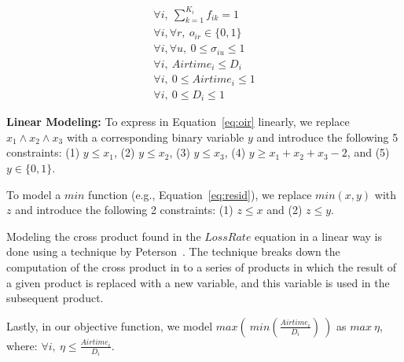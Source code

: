 \vspace{-0.1in}
\begin{eqnarray}
%
\forall i, ~\sum_{k=1}^{K_i} f_{ik} = 1 \\
%
\forall i, \forall r, ~ o_{ir} \in \{0,1\} \\
%
\forall i, \forall u, ~ 0 \leq \sigma_{iu} \leq 1 \\
\forall i, ~Airtime_i \leq D_i \\
\forall i, ~0 \leq Airtime_i \leq 1 \\
\forall i, ~0 \leq D_i \leq 1
\end{eqnarray}

\smallskip
\noindent \textbf{Linear Modeling:}  To express in Equation~\ref{eq:oir} linearly, we replace $x_1 \wedge x_2 \wedge x_3$ with a corresponding binary variable $y$ and introduce the following 5 constraints:  (1) $y \leq x_1$, (2) $y \leq x_2$, (3) $y \leq x_3$, (4) $y \geq x_1 + x_2 + x_3 -2$, and (5) $y \in \{0,1\}$. 

To model a $min$ function (e.g., Equation~\ref{eq:resid}), we replace $min(x,y)$ with $z$ and introduce the following 2 constraints: (1) $z \leq x$ and (2) $z \leq y$. 

Modeling the cross product found in the $LossRate$ equation in a linear way is done using a technique by Peterson~\cite{linprod}.  The technique breaks down the computation of the cross product in to a series of products in which the result of a given product is replaced with a new variable, and this variable is used in the subsequent product. 

Lastly, in our objective function, we model $max(~min(\frac{Airtime_i}{D_i})~)$ as $max~\eta$, where: $\forall i, ~\eta \leq \frac{Airtime_i}{D_i}$.




